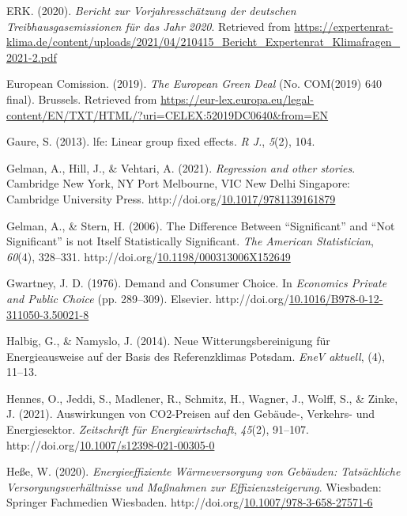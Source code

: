 \documentclass[12pt,twoside]{reedthesis}
\newlength{\cslhangindent}
\newenvironment{CSLReferences}[2] %
 {%
  \setlength{\parindent}{0pt}
  \ifodd #1 \everypar{\setlength{\hangindent}{\cslhangindent}}\ignorespaces\fi
  \ifnum #2 > 0
  \setlength{\parskip}{#2\baselineskip}
  \fi
 }%
 {}
\begin{document}
\begin{CSLReferences}{1}{0}
\leavevmode{}%
ERK. (2020). \emph{Bericht zur Vorjahresschätzung der deutschen Treibhausgasemissionen für das Jahr 2020}. Retrieved from \url{https://expertenrat-klima.de/content/uploads/2021/04/210415_Bericht_Expertenrat_Klimafragen_2021-2.pdf}

\leavevmode{}%
European Comission. (2019). \emph{The European Green Deal} (No. COM(2019) 640 final). Brussels. Retrieved from \url{https://eur-lex.europa.eu/legal-content/EN/TXT/HTML/?uri=CELEX:52019DC0640\&from=EN}

\leavevmode{}%
Gaure, S. (2013). lfe: Linear group fixed effects. \emph{R J.}, \emph{5}(2), 104.

\leavevmode{}%
Gelman, A., Hill, J., \& Vehtari, A. (2021). \emph{Regression and other stories}. Cambridge New York, NY Port Melbourne, VIC New Delhi Singapore: Cambridge University Press. http://doi.org/\href{https://doi.org/10.1017/9781139161879}{10.1017/9781139161879}

\leavevmode{}%
Gelman, A., \& Stern, H. (2006). The Difference Between {``Significant''} and {``Not Significant''} is not Itself Statistically Significant. \emph{The American Statistician}, \emph{60}(4), 328--331. http://doi.org/\href{https://doi.org/10.1198/000313006X152649}{10.1198/000313006X152649}

\leavevmode{}%
Gwartney, J. D. (1976). Demand and Consumer Choice. In \emph{Economics Private and Public Choice} (pp. 289--309). Elsevier. http://doi.org/\href{https://doi.org/10.1016/B978-0-12-311050-3.50021-8}{10.1016/B978-0-12-311050-3.50021-8}

\leavevmode{}%
Halbig, G., \& Namyslo, J. (2014). Neue Witterungsbereinigung für Energieausweise auf der Basis des Referenzklimas Potsdam. \emph{EneV aktuell}, (4), 11--13.

\leavevmode{}%
Hennes, O., Jeddi, S., Madlener, R., Schmitz, H., Wagner, J., Wolff, S., \& Zinke, J. (2021). Auswirkungen von CO2-Preisen auf den Gebäude‑, Verkehrs- und Energiesektor. \emph{Zeitschrift für Energiewirtschaft}, \emph{45}(2), 91--107. http://doi.org/\href{https://doi.org/10.1007/s12398-021-00305-0}{10.1007/s12398-021-00305-0}

\leavevmode{}%
Heße, W. (2020). \emph{Energieeffiziente Wärmeversorgung von Gebäuden: Tatsächliche Versorgungsverhältnisse und Maßnahmen zur Effizienzsteigerung}. Wiesbaden: Springer Fachmedien Wiesbaden. http://doi.org/\href{https://doi.org/10.1007/978-3-658-27571-6}{10.1007/978-3-658-27571-6}


\end{CSLReferences}
\end{document}
